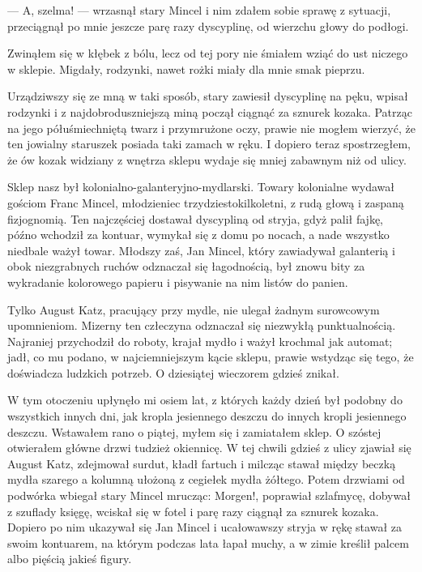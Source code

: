 \documentclass{book}
\begin{document}
— A, szelma! — wrzasnął stary Mincel i nim zdałem sobie sprawę z sytuacji, przeciągnął po mnie jeszcze parę razy dyscyplinę, od wierzchu głowy do podłogi.

Zwinąłem się w kłębek z bólu, lecz od tej pory nie śmiałem wziąć do ust niczego w sklepie. Migdały, rodzynki, nawet rożki miały dla mnie smak pieprzu.

Urządziwszy się ze mną w taki sposób, stary zawiesił dyscyplinę na pęku, wpisał rodzynki i z najdobroduszniejszą miną począł ciągnąć za sznurek kozaka. Patrząc na jego półuśmiechniętą twarz i przymrużone oczy, prawie nie mogłem wierzyć, że ten jowialny staruszek posiada taki zamach w ręku. I dopiero teraz spostrzegłem, że ów kozak widziany z wnętrza sklepu wydaje się mniej zabawnym niż od ulicy.

Sklep nasz był kolonialno-galanteryjno-mydlarski. Towary kolonialne wydawał gościom Franc Mincel, młodzieniec trzydziestokilkoletni, z rudą głową i zaspaną fizjognomią. Ten najczęściej dostawał dyscypliną od stryja, gdyż palił fajkę, późno wchodził za kontuar, wymykał się z domu po nocach, a nade wszystko niedbale ważył towar. Młodszy zaś, Jan Mincel, który zawiadywał galanterią i obok niezgrabnych ruchów odznaczał się łagodnością, był znowu bity za wykradanie kolorowego papieru i pisywanie na nim listów do panien.

Tylko August Katz, pracujący przy mydle, nie ulegał żadnym surowcowym upomnieniom. Mizerny ten człeczyna odznaczał się niezwykłą punktualnością. Najraniej przychodził do roboty, krajał mydło i ważył krochmal jak automat; jadł, co mu podano, w najciemniejszym kącie sklepu, prawie wstydząc się tego, że doświadcza ludzkich potrzeb. O dziesiątej wieczorem gdzieś znikał.

W tym otoczeniu upłynęło mi osiem lat, z których każdy dzień był podobny do wszystkich innych dni, jak kropla jesiennego deszczu do innych kropli jesiennego deszczu. Wstawałem rano o piątej, myłem się i zamiatałem sklep. O szóstej otwierałem główne drzwi tudzież okiennicę. W tej chwili gdzieś z ulicy zjawiał się August Katz, zdejmował surdut, kładł fartuch i milcząc stawał między beczką mydła szarego a kolumną ułożoną z cegiełek mydła żółtego. Potem drzwiami od podwórka wbiegał stary Mincel mrucząc: Morgen!, poprawiał szlafmycę, dobywał z szuflady księgę, wciskał się w fotel i parę razy ciągnął za sznurek kozaka. Dopiero po nim ukazywał się Jan Mincel i ucałowawszy stryja w rękę stawał za swoim kontuarem, na którym podczas lata łapał muchy, a w zimie kreślił palcem albo pięścią jakieś figury.
\end{document}
